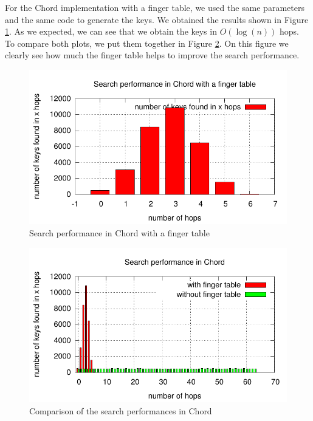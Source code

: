 \documentclass[a4paper, 11pt]{article}
\theoremstyle{plain}
\theoremstyle{definition}
\begin{document}
    

    For the Chord implementation with a finger table, we used the same parameters and the same code to generate the keys. We
    obtained the results shown in Figure \ref{fig:search-perf-chord-fing-table}. As we expected, we can see
    that we obtain the keys in $O(\log(n))$ hops. To compare both plots, we put them together in Figure
    \ref{fig:comp-search-chord}. On this figure we clearly see how much the finger table helps to improve the
    search performance.

    \begin{figure}[h]
      \centering
      \includegraphics{plots/task2-5-cluster.pdf}
      \caption{Search performance in Chord with a finger table}
      \label{fig:search-perf-chord-fing-table}
    \end{figure}

    \begin{figure}[h]
      \centering
      \includegraphics{plots/task2-5-cluster-compar.pdf}
      \caption{Comparison of the search performances in Chord}
      \label{fig:comp-search-chord}
    \end{figure}
\end{document}
